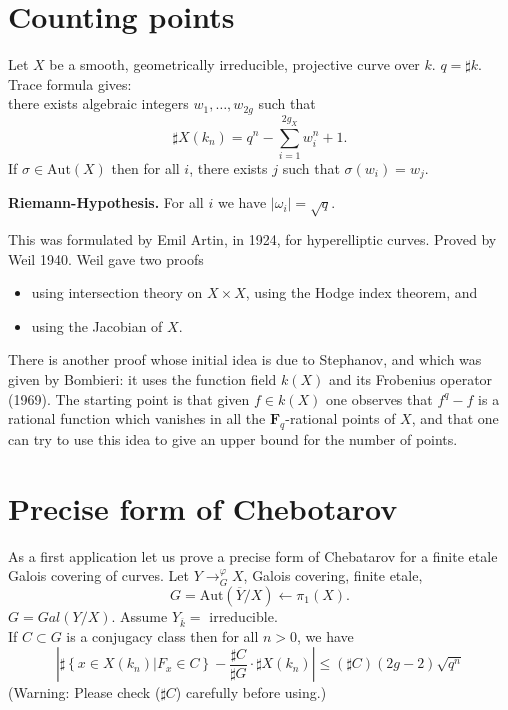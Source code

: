 \section{Counting points}
\label{section-counting}

\noindent
Let $X$ be a smooth, geometrically irreducible,
projective curve over $k$. $q=\sharp k$. Trace formula gives:\\
there exists algebraic integers $w_1, \ldots, w_{2g}$ such that
$$
\sharp X(k_n) = q^n-\sum_{i=1}^{2g_X}w_i^n+1.
$$
If $\sigma\in \text{Aut}(X)$ then for all $i$, there exists $j$ such that
$\sigma(w_i)=w_j$.

\medskip\noindent
{\bf Riemann-Hypothesis.} For all $i$ we have $|\omega_i| = \sqrt{q}$.

\medskip\noindent
This was formulated by Emil Artin, in 1924, for
hyperelliptic curves. Proved by Weil 1940. Weil gave two proofs
\begin{itemize}
\item using intersection theory on $X\times X$, using the
Hodge index theorem, and
\item using the Jacobian of $X$.
\end{itemize}
There is another proof whose initial idea is due to Stephanov, and
which was given by Bombieri: it uses the function field $k(X)$ and
its Frobenius operator (1969). The starting point is that given
$f\in k(X)$ one observes that $f^q - f$ is a rational function which
vanishes in all the $\mathbf{F}_q$-rational points of $X$, and that one
can try to use this idea to give an upper bound for the number of points.


\section{Precise form of Chebotarov}
\label{section-chebotarov}

\noindent
As a first application let us prove a precise form of Chebatarov
for a finite etale Galois covering of curves.
Let $Y\to^\varphi_G X$, Galois covering, finite etale,
$$
G = \text{Aut}(\overline Y/X) \leftarrow \pi_1(X).
$$
$G=Gal(Y/X)$.
Assume $Y_{\overline k} = $ irreducible. \\
If $C\subset G$ is a conjugacy class then for all $n>0$, we have
$$
\left|\sharp\left\{x\in X(k_n)\left|F_x\in
C\right.\right\}-\frac{\sharp C}{\sharp G}\cdot\sharp X(k_n)\right|\leq (\sharp
C)(2g-2)\sqrt{q^n}
$$
(Warning: Please check ($\sharp C$) carefully before using.)\\

